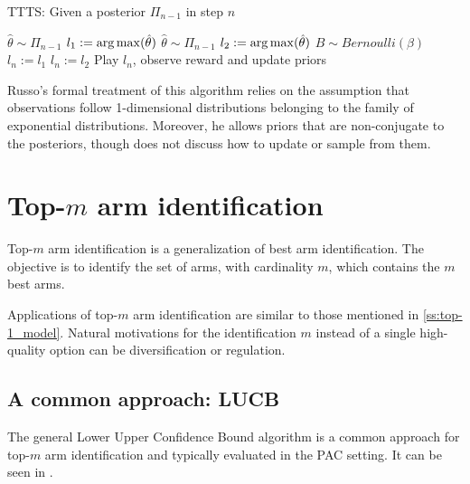 \begin{algorithm}[H]
    \caption{TTTS: Given a posterior $\Pi_{n-1}$ in step $n$}
    \label{alg:TTTS}
  \begin{algorithmic}
    \State $\hat{\theta} \sim \Pi_{n-1}$
    \State $l_1 := \operatorname*{arg\,max}(\hat{\theta})$
    \Repeat
      \State $\hat{\theta} \sim \Pi_{n-1}$
      \State $l_2 := \operatorname*{arg\,max}(\hat{\theta})$
    \State $B \sim Bernoulli(\beta)$
      \State $l_n := l_1$
    \Else
      \State $l_n := l_2$
    \EndIf
    \State Play $l_n$, observe reward and update priors
  \end{algorithmic}
\end{algorithm}

Russo's formal treatment of this algorithm relies on the assumption that
observations follow 1-dimensional distributions belonging to the family of
exponential distributions. Moreover, he allows priors that are non-conjugate to
the posteriors, though does not discuss how to update or sample from them.

\section{Top-$m$ arm identification}

Top-$m$ arm identification is a generalization of best arm identification. The
objective is to identify the set of arms, with cardinality $m$, which contains
the $m$ best arms.

Applications of top-$m$ arm identification are similar to those mentioned in
\ref{ss:top-1_model}. Natural motivations for the identification $m$
instead of a single high-quality option can be diversification or regulation.

\subsection{A common approach: LUCB}
The general Lower Upper Confidence Bound algorithm is a common approach for
top-$m$ arm identification \cite{kaufmann2013information} and typically evaluated in the PAC setting. It can be
seen in .

